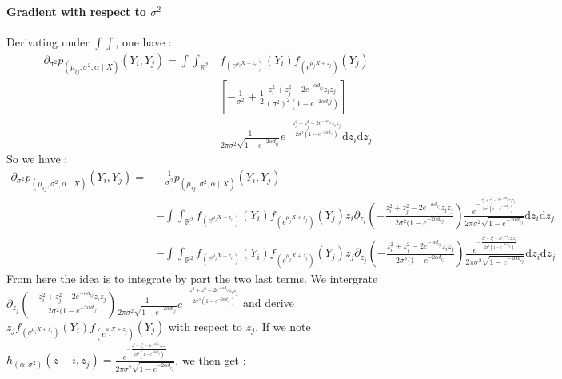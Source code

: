 \documentclass[11pt, a4paper]{article}
\begin{document}
\paragraph{Gradient with respect to $\sigma^2$}
Derivating under $\int \int$, one have :
\begin{align*}
\partial_{\sigma^2} p_{(\mu_{ij},\sigma^2,\alpha \mid X)}(Y_i,Y_j) =\int \int _{\mathbb{R}^2} & f_{(e^{\mu_i X + z_i})}(Y_i) f_{(e^{\mu_j X + z_j})}(Y_j) \\
&[-\frac{1}{\sigma^2} + \frac{1}{2} \frac{z_i^2 + z_j^2 - 2 e^{- \alpha d_{ij}} z_i z_j}{(\sigma^2)^2 (1-e^{-2 \alpha d_ij})}] \\
& \frac{1}{2 \pi \sigma^2 \sqrt{1-e^{-2 \alpha d_{ij}}}} e^{- \frac{z_i^2+z_j^2-2 e^{- \alpha d_{ij}} z_i z_j}{2 \sigma^2 (1- e^{-2 \alpha d_{ij}})}} \mathrm{d}z_i \mathrm{d} z_j
\end{align*}
 So we have :
 \begin{align*}
 \partial_{\sigma^2} p_{(\mu_{ij},\sigma^2,\alpha \mid X)}(Y_i,Y_j) = &-\frac{1}{\sigma^2}p_{(\mu_{ij},\sigma^2,\alpha \mid X)}(Y_i,Y_j)  \\
 & - \int \int_{\mathbb{R}^2} f_{(e^{\mu_i X + z_i})}(Y_i) f_{(e^{\mu_j X + z_j})}(Y_j) z_i \partial_{z_i} (- \frac{z_i^2+z_j^2-2 e^{- \alpha d_{ij}} z_i z_j}{2 \sigma^2 (1- e^{-2 \alpha d_{ij}}}) \frac{e^{- \frac{z_i^2+z_j^2-2 e^{- \alpha d_{ij}} z_i z_j}{2 \sigma^2 (1- e^{-2 \alpha d_{ij}})}}}{2 \pi \sigma^2 \sqrt{1-e^{-2 \alpha d_{ij}}}}  \mathrm{d}z_i \mathrm{d} z_j \\
 &- \int \int_{\mathbb{R}^2} f_{(e^{\mu_i X + z_i})}(Y_i) f_{(e^{\mu_j X + z_j})}(Y_j) z_j \partial_{z_j} (- \frac{z_i^2+z_j^2-2 e^{- \alpha d_{ij}} z_i z_j}{2 \sigma^2 (1- e^{-2 \alpha d_{ij}}}) \frac{e^{- \frac{z_i^2+z_j^2-2 e^{- \alpha d_{ij}} z_i z_j}{2 \sigma^2 (1- e^{-2 \alpha d_{ij}})}}}{2 \pi \sigma^2 \sqrt{1-e^{-2 \alpha d_{ij}}}}  \mathrm{d}z_i \mathrm{d} z_j
 \end{align*}
 From here the idea is to integrate by part the two last terms. We intergrate $\partial_{z_j} (- \frac{z_i^2+z_j^2-2 e^{- \alpha d_{ij}} z_i z_j}{2 \sigma^2 (1- e^{-2 \alpha d_{ij}}}) \frac{1}{2 \pi \sigma^2 \sqrt{1-e^{-2 \alpha d_{ij}}}} e^{- \frac{z_i^2+z_j^2-2 e^{- \alpha d_{ij}} z_i z_j}{2 \sigma^2 (1- e^{-2 \alpha d_{ij}})}}$ and derive $ z_j f_{(e^{\mu_i X + z_i})}(Y_i) f_{(e^{\mu_j X + z_j})}(Y_j)$ with respect to $z_j$. If we note $h_{(\alpha, \sigma^2)}(z-i,z_j) =  \frac{e^{- \frac{z_i^2+z_j^2-2 e^{- \alpha d_{ij}} z_i z_j}{2 \sigma^2 (1- e^{-2 \alpha d_{ij}})}}}{2 \pi \sigma^2 \sqrt{1-e^{-2 \alpha d_{ij}}}} $, we then get :
\end{document}

